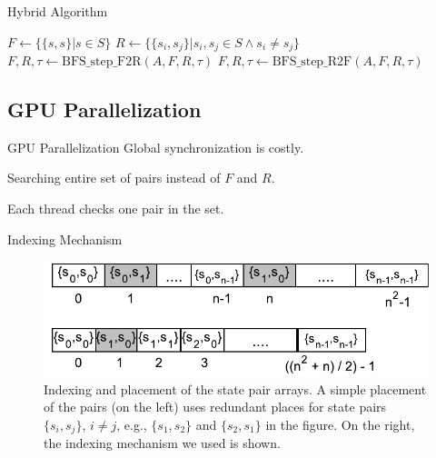 \documentclass{beamer}
\begin{document}
\begin{frame}{Hybrid Algorithm}
\begin{algorithm}[H]
	\label{algo:BFS-Hybrid}
	\caption{Computing a function $\tau : S^{\langle 2 \rangle} \rightarrow \Sigma^\star$ (Hybrid)}
	
	

	
	$F \longleftarrow \{ \{ s,s \} | s \in S \}$\;
	$R \longleftarrow \{ \{ s_i,s_j \} | s_i,s_j \in S \wedge s_i \neq s_j \}$\;
	{
		{
			$F,R,\tau \longleftarrow \mbox{BFS\_step\_F2R}(A,F,R,\tau)$\;
		}
		\Else
		{
			$F,R,\tau \longleftarrow \mbox{BFS\_step\_R2F}(A,F,R,\tau)$\;
		}
	}
\end{algorithm}
\end{frame}

\subsection{GPU Parallelization}
\begin{frame}{GPU Parallelization}
	Global synchronization is costly.
	
	\medskip
	
	Searching entire set of pairs instead of $F$ and $R$.
	
	\medskip
	
	Each thread checks one pair in the set.
\end{frame}

\begin{frame}{Indexing Mechanism}
	\begin{figure}
	\centering
	\includegraphics[width=\textwidth]{figs/memory.pdf}
	\caption{Indexing and placement of the state pair arrays. A simple placement of the pairs (on the left) uses redundant places for state pairs $\{s_i, s_j\}$, $i \neq j$, e.g., $\{s_1, s_2\}$ and $\{s_2, s_1\}$ in the figure. On the right, the indexing mechanism we used is shown.}
	\label{fig:mem}
\end{figure}
\end{frame}
\end{document}
